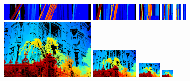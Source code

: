 \documentclass{article}
\theoremstyle{definition}
\begin{document}
\begin{figure}[th]
  \includegraphics[width=0.4\textwidth]{images/pyr/1522269722500_pyr_epi_000.png}
  \includegraphics[width=0.2\textwidth]{images/pyr/1522269722500_pyr_epi_001.png}
  \includegraphics[width=0.1\textwidth]{images/pyr/1522269722500_pyr_epi_002.png}
  \includegraphics[width=0.05\textwidth]{images/pyr/1522269722500_pyr_epi_003.png}
  \includegraphics[width=0.025\textwidth]{images/pyr/1522269722500_pyr_epi_004.png}
  \includegraphics[width=0.0125\textwidth]{images/pyr/1522269722500_pyr_epi_005.png}
  \\[0.5cm]
  \includegraphics[width=0.4\textwidth]{images/pyr/1522286815730_pyr_depth_000.png}
  \includegraphics[width=0.2\textwidth]{images/pyr/1522286815730_pyr_depth_001.png}
  \includegraphics[width=0.1\textwidth]{images/pyr/1522286815730_pyr_depth_002.png}
  \includegraphics[width=0.05\textwidth]{images/pyr/1522286815730_pyr_depth_003.png}

\end{figure}
\end{document}
